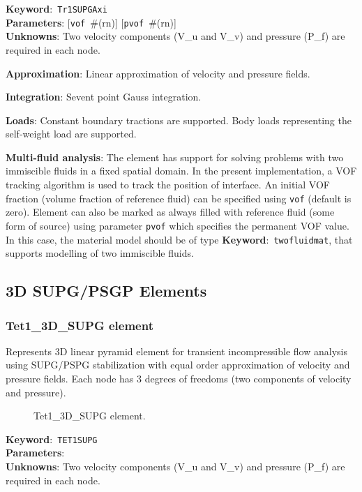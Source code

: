 \documentclass[a4paper]{article}
\newcommand{\descitem}[1]{{\noindent \textbf{#1}}:}
\newcommand{\elemkeyword}[1]{\descitem{Keyword}~\param{#1}} %
\newcommand{\param}[1]{\texttt{#1}} %
\newcommand{\optional}[1]{[#1]} %
\newcommand{\field}[2]{\param{#1}~\#{\tiny(#2)}} %
\newcommand{\optField}[2]{\optional{\field{#1}{#2}}}
\begin{document}
\elemkeyword{Tr1SUPGAxi}\\
\descitem{Parameters} \optField{vof}{rn}
\optField{pvof}{rn}\\
\descitem{Unknowns}
Two velocity components (V\_u and V\_v) and pressure (P\_f) are required in each node.

\descitem{Approximation} Linear approximation of velocity and pressure
fields.

\descitem{Integration}
Sevent point Gauss integration.

\descitem{Loads} Constant boundary tractions are supported. Body loads
representing the self-weight load are supported.

\descitem{Multi-fluid analysis} The element has support for solving
problems with two immiscible fluids in
a fixed spatial domain. In the present implementation, a VOF tracking algorithm
is used to track the position of interface. An initial VOF fraction
(volume fraction of reference fluid) can be specified using
\param{vof} (default is zero). Element can also be marked as always
filled with reference fluid (some form of source) using parameter
\param{pvof} which specifies the permanent VOF value. In this case,
the material model should be of type \elemkeyword{twofluidmat}, that
supports modelling of two immiscible fluids.

\clearpage
\subsection{3D SUPG/PSGP Elements}
\subsubsection{Tet1\_3D\_SUPG element}
\label{PY1_3D_SUPG}
Represents 3D linear pyramid element for transient
incompressible flow analysis using SUPG/PSPG stabilization with equal order
approximation of velocity and pressure fields. Each node has 3 degrees
of freedoms (two components of velocity and pressure).

\begin{figure}[htb]
 \centering
 \begin{makeimage}
  
 \end{makeimage}
 \caption{Tet1\_3D\_SUPG element.}
 \label{PY1_3D_SUPGfig}
\end{figure}

\elemkeyword{TET1SUPG}\\
\descitem{Parameters} \\
\descitem{Unknowns}
Two velocity components (V\_u and V\_v) and pressure (P\_f) are required in each node.
\end{document}
